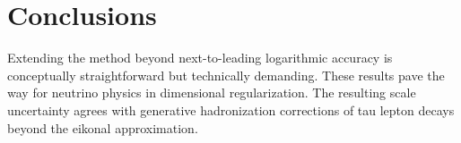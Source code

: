 \section{Conclusions}\label{sec:conclusions}

Extending the method beyond next-to-leading logarithmic accuracy is
conceptually straightforward but technically demanding. These results
pave the way for neutrino physics in dimensional regularization. The
resulting scale uncertainty agrees with generative hadronization
corrections of tau lepton decays beyond the eikonal approximation.

